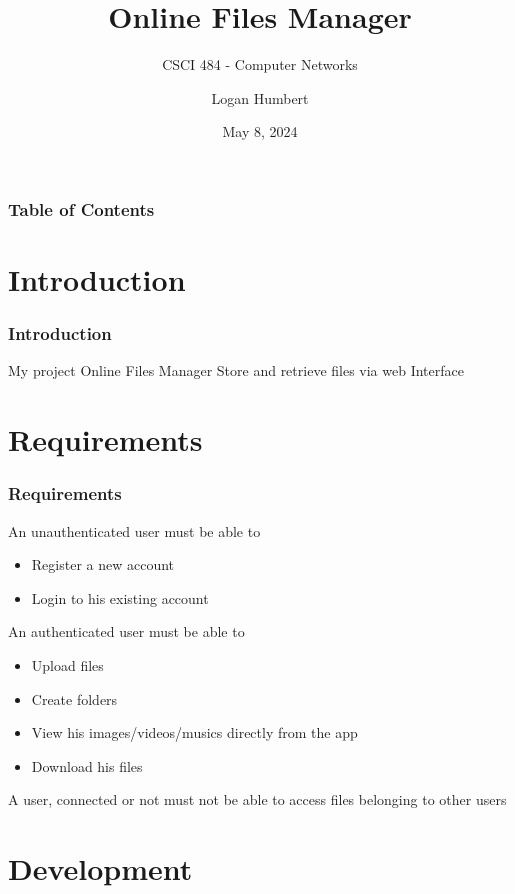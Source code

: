 \documentclass{beamer}
\title{Online Files Manager}
\subtitle{CSCI 484 - Computer Networks}
\author{Logan Humbert}
\institute{Colorado Mesa University}
\date{May 8, 2024}
\begin{document}
	\frame{\titlepage}
	
	\begin{frame}
		\frametitle{Table of Contents}
		\tableofcontents
	\end{frame}
	
	\section{Introduction}
	\begin{frame}
		\frametitle{Introduction}
		
		\begin{alertblock}{My project}
			Online Files Manager
			\linebreak Store and retrieve files via web Interface
		\end{alertblock}
	\end{frame}
	
	\section{Requirements}
	\begin{frame}
		\frametitle{Requirements}
		
		\begin{alertblock}{An unauthenticated user must be able to}
			\begin{itemize}
				\item Register a new account
				\item Login to his existing account
			\end{itemize}
		\end{alertblock}
		
		\begin{alertblock}{An authenticated user must be able to}
			\begin{itemize}
				\item Upload files
				\item Create folders
				\item View his images/videos/musics directly from the app
				\item Download his files
			\end{itemize}
		\end{alertblock}
		
		A user, connected or not must not be able to access files belonging to other users
	\end{frame}
	
	\section{Development}
\end{document}
